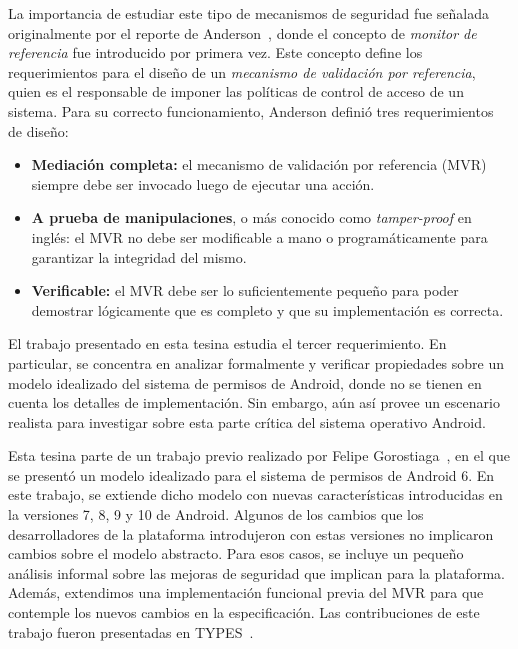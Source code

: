 La importancia de estudiar este tipo de mecanismos de seguridad fue señalada originalmente por el
reporte de Anderson~\cite{Anderson:1972}, donde el concepto de \textit{monitor de referencia} fue
introducido por primera vez. Este concepto define los requerimientos para el diseño de un
\textit{mecanismo de validación por referencia}, quien es el responsable de imponer las políticas de
control de acceso de un sistema. Para su correcto funcionamiento, Anderson definió tres
requerimientos de diseño:

\begin{itemize}
    \item \textbf{Mediación completa:} el mecanismo de validación por referencia (MVR) siempre debe
          ser invocado luego de ejecutar una acción.
    \item \textbf{A prueba de manipulaciones}, o más conocido como \textit{tamper-proof} en inglés:
          el MVR no debe ser modificable a mano o programáticamente para garantizar la
          integridad del mismo.
    \item \textbf{Verificable:} el MVR debe ser lo suficientemente pequeño para poder demostrar
          lógicamente que es completo y que su implementación es correcta.
\end{itemize}

El trabajo presentado en esta tesina estudia el tercer requerimiento. En particular, se concentra en
analizar formalmente y verificar propiedades sobre un modelo idealizado del sistema de permisos de
Android, donde no se tienen en cuenta los detalles de implementación. Sin embargo, aún así provee un
escenario realista para investigar sobre esta parte crítica del sistema operativo Android.

Esta tesina parte de un trabajo previo realizado por Felipe Gorostiaga~\cite{fgorostiaga}, en el que
se presentó un modelo idealizado para el sistema de permisos de Android 6. En este trabajo, se
extiende dicho modelo con nuevas características introducidas en la versiones 7, 8, 9 y 10 de
Android. Algunos de los cambios que los desarrolladores de la plataforma introdujeron con estas
versiones no implicaron cambios sobre el modelo abstracto. Para esos casos, se incluye un pequeño
análisis informal sobre las mejoras de seguridad que implican para la plataforma. Además, extendimos
una implementación funcional previa del MVR para que contemple los nuevos cambios en la
especificación. Las contribuciones de este trabajo fueron presentadas en TYPES~\cite{types-deluca}.

